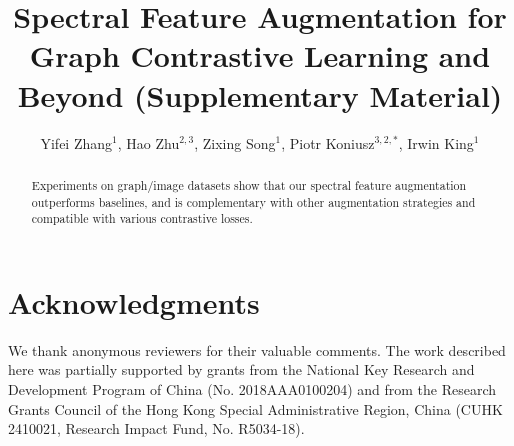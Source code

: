 \documentclass[letterpaper]{article} %
\begin{document}
\begin{abstract}
%
%
%
%
Experiments on graph/image datasets show that our spectral feature augmentation  outperforms %
baselines, and is complementary with other  augmentation strategies and compatible with various contrastive losses. %

\end{abstract}








\newpage
\section{Acknowledgments}
We thank anonymous reviewers for their valuable comments. 
The work described here was partially supported by grants from the National Key Research and Development Program of China (No. 2018AAA0100204) and from the Research Grants Council of the Hong Kong Special Administrative Region, China (CUHK 2410021, Research Impact Fund, No. R5034-18).



\newpage
\clearpage
\appendix
\title{Spectral Feature Augmentation for Graph Contrastive Learning and Beyond (Supplementary Material)}
\author{
    Yifei Zhang$^{1}$, Hao Zhu$^{2,3}$, Zixing Song$^{1}$, Piotr Koniusz$^{3,2,*}$, Irwin King$^{1}$\\
}
\end{document}

